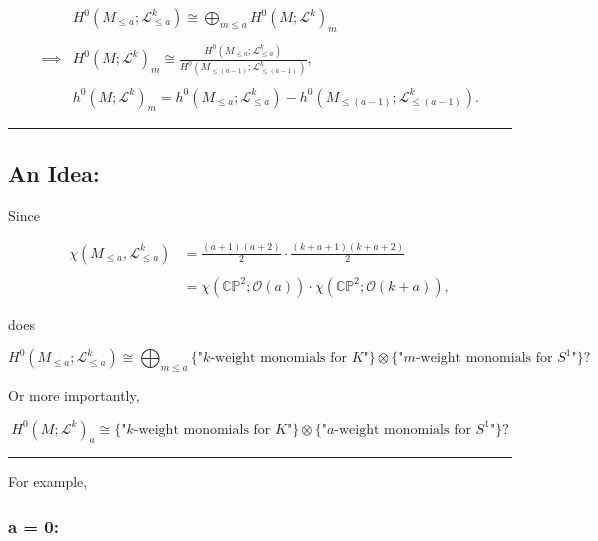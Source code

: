 \documentclass[11pt]{article}
\begin{document}
\[ \begin{split} &H^{0}(M_{\leq a}; \mathcal{L}_{\leq a}^{k}) \cong \bigoplus_{m \leq a} H^{0}(M ; \mathcal{L}^{k})_{m} \\ & \\ \implies &H^{0}(M; \mathcal{L}^{k})_{m} \cong \frac{H^{0}(M_{\leq a}; \mathcal{L}_{\leq a}^{k})}{H^{0}(M_{\leq (a-1)}; \mathcal{L}_{\leq (a-1)}^{k})}, \\ & \\ &h^{0}(M; \mathcal{L}^{k})_{m} = h^{0}(M_{\leq a}; \mathcal{L}_{\leq a}^{k}) - h^{0}(M_{\leq (a-1)}; \mathcal{L}_{\leq (a-1)}^{k}). \end{split} \]

\begin{center}\rule{0.5\linewidth}{0.5pt}\end{center}

\hypertarget{an-idea}{%
\subsection{An Idea:}\label{an-idea}}

Since

\[ \begin{split} \chi\left(M_{\leq a}, \mathcal{L}_{\leq a}^{k}\right) &= \frac{(a+1)(a+2)}{2} \cdot \frac{(k+a+1)(k+a+2)}{2} \\ & \\ &= \chi\left(\mathbb{CP}^{2}; \mathcal{O}(a)\right) \cdot \chi\left(\mathbb{CP}^{2}; \mathcal{O}(k + a)\right), \end{split} \]

does

\[ H^{0}(M_{\leq a}; \mathcal{L}_{\leq a}^{k}) \cong \bigoplus_{m \leq a} \{ \text{"$k$-weight monomials for $K$"} \} \otimes \{ \text{"$m$-weight monomials for $S^{1}$"} \}? \]

Or more importantly,

\[ H^{0}(M; \mathcal{L}^{k})_{a} \cong \{ \text{"$k$-weight monomials for $K$"} \} \otimes \{ \text{"$a$-weight monomials for $S^{1}$"} \}? \]

\begin{center}\rule{0.5\linewidth}{0.5pt}\end{center}

For example,

\hypertarget{a-0}{%
\subsubsection{a = 0:}\label{a-0}}
\end{document}
